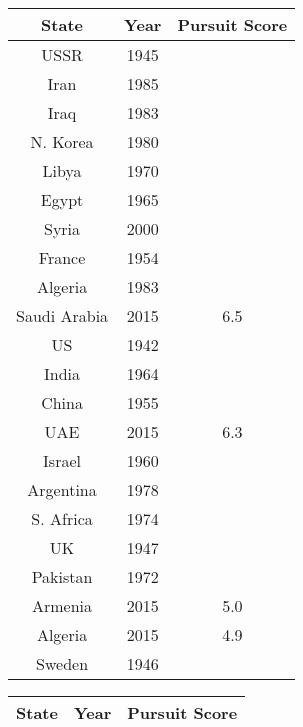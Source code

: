 \begin{table}
  \centering
  \begin{minipage}{.5\textwidth}

\begin{tabular}{|c|c|c|}
\hline
\textbf{State} & \textbf{Year}  & \textbf{Pursuit Score} \\
\hline
USSR & 1945 & \color{red}{8.9} \\
Iran & 1985 & \color{red}{8.3} \\
Iraq & 1983 & \color{red}{8.2} \\
N. Korea & 1980 & \color{red}{7.7} \\
Libya & 1970 & \color{red}{7.4} \\
Egypt & 1965 & \color{red}{7.3} \\
Syria & 2000 & \color{red}{6.9} \\
France & 1954 & \color{red}{6.8} \\
Algeria & 1983 & \color{red}{6.6} \\
Saudi Arabia & 2015 & 6.5 \\
US & 1942 & \color{red}{6.5} \\
India & 1964 & \color{red}{6.4} \\
China & 1955 & \color{red}{6.3} \\
UAE & 2015 & 6.3 \\
Israel & 1960 & \color{red}{6.2} \\
Argentina & 1978 & \color{red}{6.1} \\
S. Africa & 1974 & \color{red}{5.9} \\
UK & 1947 & \color{red}{5.8} \\
Pakistan & 1972 & \color{red}{5.3} \\
Armenia & 2015 & 5.0 \\
Algeria & 2015 & 4.9 \\
Sweden & 1946 & \color{red}{4.8} \\

\hline
\end{tabular}
\end{minipage}\hfill
\begin{minipage}{.5\textwidth}
\begin{tabular}{|c|c|c|}
\hline
\textbf{State} & \textbf{Year}  & \textbf{Pursuit Score} \\
\hline


\end{tabular}
\end{minipage}
\end{table}
